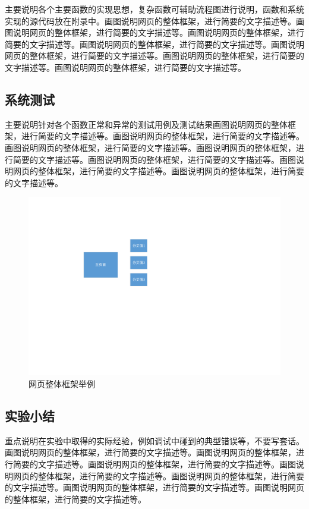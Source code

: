 \documentclass[supercite]{Experimental_Report}
\theoremstyle{definition}
\begin{document}
主要说明各个主要函数的实现思想，复杂函数可辅助流程图进行说明，函数和系统实现的源代码放在附录中。画图说明网页的整体框架，进行简要的文字描述等。画图说明网页的整体框架，进行简要的文字描述等。画图说明网页的整体框架，进行简要的文字描述等。画图说明网页的整体框架，进行简要的文字描述等。画图说明网页的整体框架，进行简要的文字描述等。画图说明网页的整体框架，进行简要的文字描述等。画图说明网页的整体框架，进行简要的文字描述等。

\subsection{系统测试}

主要说明针对各个函数正常和异常的测试用例及测试结果画图说明网页的整体框架，进行简要的文字描述等。画图说明网页的整体框架，进行简要的文字描述等。画图说明网页的整体框架，进行简要的文字描述等。画图说明网页的整体框架，进行简要的文字描述等。画图说明网页的整体框架，进行简要的文字描述等。画图说明网页的整体框架，进行简要的文字描述等。画图说明网页的整体框架，进行简要的文字描述等。

\begin{figure}[htb] %
	\begin{center}
		\includegraphics[scale=0.80]{images/1-1.pdf}
		\caption{网页整体框架举例}
		\label{fig1-1}
	\end{center}
\end{figure}

\subsection{实验小结}

重点说明在实验中取得的实际经验，例如调试中碰到的典型错误等，不要写套话。画图说明网页的整体框架，进行简要的文字描述等。画图说明网页的整体框架，进行简要的文字描述等。画图说明网页的整体框架，进行简要的文字描述等。画图说明网页的整体框架，进行简要的文字描述等。画图说明网页的整体框架，进行简要的文字描述等。画图说明网页的整体框架，进行简要的文字描述等。画图说明网页的整体框架，进行简要的文字描述等。
\end{document}
